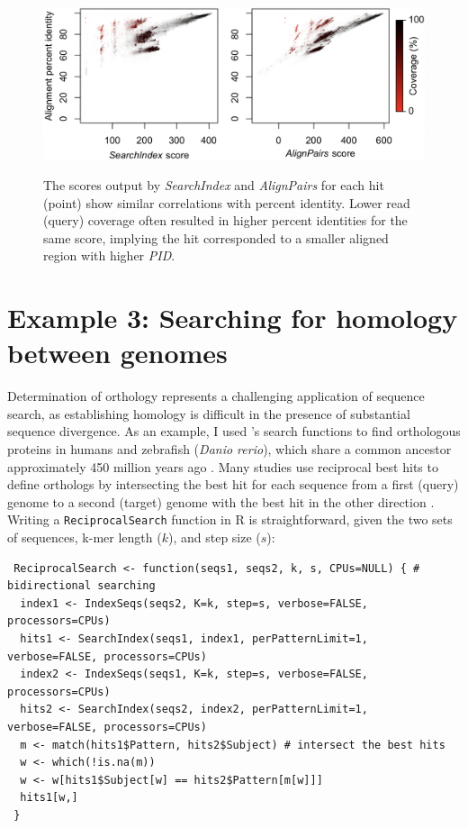 \begin{figure}
\includegraphics[width=1\linewidth,alt={}]{figures/Fig4} \caption{The scores output by \textit{SearchIndex} and \textit{AlignPairs} for each hit (point) show similar correlations with percent identity. Lower read (query) coverage often resulted in higher percent identities for the same score, implying the hit corresponded to a smaller aligned region with higher \textit{PID}.}\label{fig:fig4}
\end{figure}

\section{Example 3: Searching for homology between genomes}\label{example-3-searching-for-homology-between-genomes}

Determination of orthology represents a challenging application of sequence search, as establishing homology is difficult in the presence of substantial sequence divergence. As an example, I used 's search functions to find orthologous proteins in humans and zebrafish (\textit{Danio rerio}), which share a common ancestor approximately 450 million years ago \citep{RN4252}. Many studies use reciprocal best hits to define orthologs by intersecting the best hit for each sequence from a first (query) genome to a second (target) genome with the best hit in the other direction \citep{RN4232}. Writing a \texttt{ReciprocalSearch} function in R is straightforward, given the two sets of sequences, k-mer length (\(k\)), and step size (\(s\)):

\begin{verbatim}
 ReciprocalSearch <- function(seqs1, seqs2, k, s, CPUs=NULL) { # bidirectional searching
  index1 <- IndexSeqs(seqs2, K=k, step=s, verbose=FALSE, processors=CPUs)
  hits1 <- SearchIndex(seqs1, index1, perPatternLimit=1, verbose=FALSE, processors=CPUs)
  index2 <- IndexSeqs(seqs1, K=k, step=s, verbose=FALSE, processors=CPUs)
  hits2 <- SearchIndex(seqs2, index2, perPatternLimit=1, verbose=FALSE, processors=CPUs)
  m <- match(hits1$Pattern, hits2$Subject) # intersect the best hits
  w <- which(!is.na(m))
  w <- w[hits1$Subject[w] == hits2$Pattern[m[w]]]
  hits1[w,]
 }
\end{verbatim}

